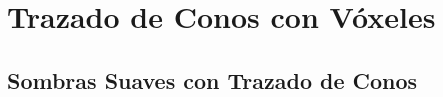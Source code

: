 \section{Trazado de Conos con Vóxeles} %
\label{sec:trazado_de_conos_con_voxeles}


\subsection{Sombras Suaves con Trazado de Conos} %
\label{sub:sombras_suaves_con_trazado_de_conos}


